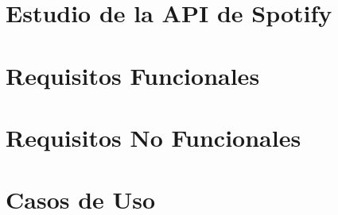 \section{Estudio de la API de Spotify}

\section{Requisitos Funcionales}

\section{Requisitos No Funcionales}

\section{Casos de Uso}